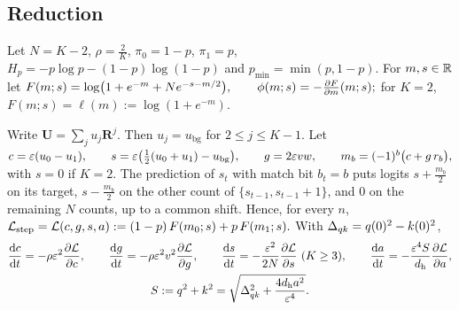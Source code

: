 \subsection{Reduction}

Let $N=K-2$, $\rho=\frac{2}{K}$, $\pi_0=1-p$, $\pi_1=p$, $H_p=-p\log p-(1-p)\log(1-p)$ and $p_{\min}=\min(p,1-p)$. For $m,s\in\mathbb R$ let
 $F(m;s)=\log\bigl(1+e^{-m}+N e^{-s-m/2}\bigr),\qquad \phi(m;s)=-\pd{F}{m}(m;s);$ 
for $K=2$, $F(m;s)=\ell(m):=\log(1+e^{-m})$.

\begin{lemma}
\label{lem:J-reduce}
Write $\mathbf U=\sum_ju_j\mathbf R^j$. Then $u_j=u_{\mathrm{bg}}$ for $2\le j\le K-1$. Let
 $c=\initscale(u_0-u_1),\qquad s=\initscale\bigl(\tfrac{1}{2}(u_0+u_1)-u_{\mathrm{bg}}\bigr),\qquad g=2\initscale vw,\qquad m_b=(-1)^b\bigl(c+g\,r_b\bigr),$ 
with $s=0$ if $K=2$. The prediction of $s_t$ with match bit $b_t=b$ puts logits $s+\frac{m_b}{2}$ on its target, $s-\frac{m_b}{2}$ on the other count of
$\{s_{t-1},s_{t-1}+1\}$, and $0$ on the remaining $N$ counts, up to a common shift. Hence, for every $n$,
 $\mathcal L_{\mathrm{step}}=\mathcal L(c,g,s,a):=(1-p)\,F(m_0;s)+p\,F(m_1;s).$ 
With $\Delta_{qk}=q(0)^2-k(0)^2$,
\begin{equation}
 \begin{gathered}
 \ddt{c}=-\rho\initscale^2\pd{\mathcal L}{c},\qquad \ddt{g}=-\rho\initscale^2v^2\pd{\mathcal L}{g},\qquad \ddt{s}=-\frac{\initscale^2}{2N}\pd{\mathcal L}{s}\ (K\ge3),\qquad \ddt{a}=-\frac{\initscale^4S}{d_{\mathrm h}}\pd{\mathcal L}{a},\\
 S:=q^2+k^2=\sqrt{\qkbalance^2+\frac{4d_{\mathrm h}a^2}{\initscale^4}}.
 \end{gathered}
 \label{eq:J-flow}
\end{equation}
\end{lemma}

